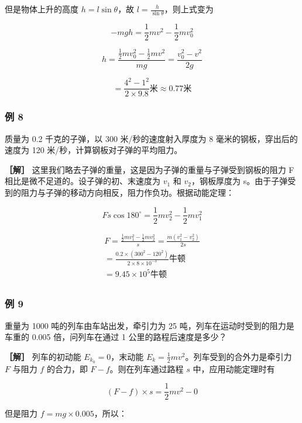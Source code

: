 但是物体上升的高度 \(h = l\sin \theta\)，故
\(l = \frac{h}{\sin\theta}\)，则上式变为

\[
- m g h = \frac {1}{2} m v ^ {2} - \frac {1}{2} m v _ {0} ^ {2}
\]

\[
h=\frac{\frac{1}{2}mv_{0}^{2}-\frac{1}{2}mv^{2}}{mg} =\frac{v_{0}^{2}-v^{2}}{2g}
\]

\[
=\frac{4^{2}-1^{2}}{2\times9.8}\text{米} \approx0.77\text{米}
\]

\subsubsection{例 8}\label{ux4f8b-8-5}

质量为 0.2 千克的子弹，以 300 米/秒的速度射入厚度为 8
毫米的钢板，穿出后的速度为 120 米/秒，计算钢板对子弹的平均阻力。

\textbf{［解］}
这里我们略去子弹的重量，这是因为子弹的重量与子弹受到钢板的阻力 F
相比是微不足道的。设子弹的初、末速度为 \(v_{1}\) 和
\(v_{2}\)，钢板厚度为
s。由于子弹受到的阻力与子弹的移动方向相反，阻力作负功。根据动能定理：

\[
F s \cos 180 ^ {\circ} = \frac {1}{2} m v _ {2} ^ {2} - \frac {1}{2} m v _ {1} ^ {2}
\]

\[
\begin{array}{l} F = \frac {\frac {1}{2} m v _ {1} ^ {2} - \frac {1}{2} m v _ {2} ^ {2}}{s} = \frac {m \left(v _ {1} ^ {2} - v _ {2} ^ {2}\right)}{2 s} \\ = \frac {0.2 \times (300 ^ {2} - 120 ^ {2})}{2 \times 8 \times 10 ^ {- 3}} \text{牛顿} \\ = 9.45 \times 10 ^ {5} \text{牛顿} \\ \end{array}
\]

\subsubsection{例 9}\label{ux4f8b-9-5}

重量为 1000 吨的列车由车站出发，牵引力为 25
吨，列车在运动时受到的阻力是车重的 0.005 倍，问列车在通过 1
公里的路程后速度是多少？

\textbf{［解］} 列车的初动能 \(E_{k_0} = 0\)，末动能
\(E_{k} = \frac{1}{2} mv^2\)。列车受到的合外力是牵引力 \(F\) 与阻力
\(f\) 的合力，即 \(F - f\)。则在列车通过路程 \(s\) 中，应用动能定理时有

\[
(F - f) \times s = \frac {1}{2} m v ^ {2} - 0
\]

但是阻力 \(f = mg \times 0.005\)，所以：

